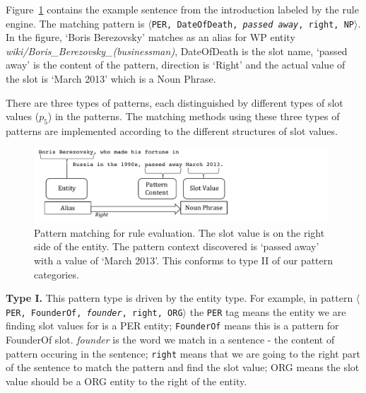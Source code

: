 \documentclass[letterpaper]{article}
\begin{document}
Figure~\ref{fig:pattern} contains the example sentence from the introduction labeled by the rule engine. The matching pattern is $\langle$\texttt{PER, DateOfDeath, \textit{passed away}, right, NP}$\rangle$. In the figure, `Boris Berezovsky' matches as an alias for WP entity \textsl{wiki/Boris\_Berezovsky\_(businessman)}, DateOfDeath is the slot name, `passed away' is the content of the pattern, direction is `Right' and the actual value of the slot is `March 2013' which is a Noun Phrase.

There are three types of patterns, each distinguished by different types of slot values ($p_5$) in the patterns.
The matching methods using these three types of patterns are implemented according to the different structures of slot values.

\begin{figure}
\centering
\includegraphics[width = 11cm]{./images/Pattern-crop.pdf}
\vspace*{-.1in}
\caption{Pattern matching for rule evaluation. The slot value is on the right side of the 
entity. The pattern context discovered is `passed away' with a value of `March 2013'. This conforms to type II of our pattern categories.}\label{fig:pattern}
\vspace*{-.2in}
\end{figure}
 
\textbf{Type I.} This pattern type is driven by the entity type.
For example, in pattern $\langle$\texttt{PER, FounderOf, \textit{founder}, right, ORG}$\rangle$ the \texttt{PER} 
tag means the entity we are finding slot values for is a PER entity;
\texttt{FounderOf} means this is a pattern for FounderOf slot.
\textit{founder} is the word we match in a sentence - the content of pattern occuring in the sentence;
\texttt{right} means that we are going to the right part of the sentence to match the pattern and find the slot value;
ORG means the slot value should be a ORG entity to the right of the entity.
\end{document}
